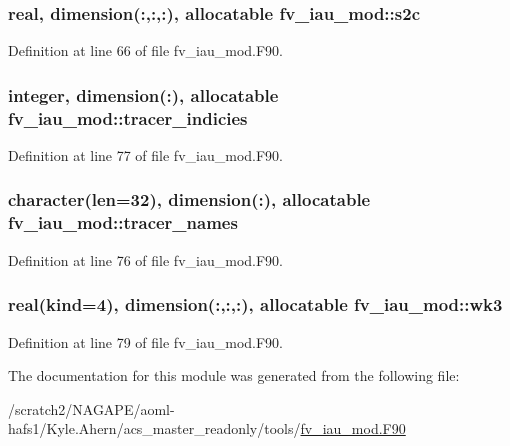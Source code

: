 \subsubsection[{s2c}]{\setlength{\rightskip}{0pt plus 5cm}real, dimension(\-:,\-:,\-:), allocatable fv\-\_\-iau\-\_\-mod\-::s2c\hspace{0.3cm}{\ttfamily [private]}}\label{classfv__iau__mod_a0967901620cb181a32bcb765735ca893}


Definition at line 66 of file fv\-\_\-iau\-\_\-mod.\-F90.

\subsubsection[{tracer\-\_\-indicies}]{\setlength{\rightskip}{0pt plus 5cm}integer, dimension(\-:), allocatable fv\-\_\-iau\-\_\-mod\-::tracer\-\_\-indicies\hspace{0.3cm}{\ttfamily [private]}}\label{classfv__iau__mod_a21f83d74d28c045c736b76aa21d14811}


Definition at line 77 of file fv\-\_\-iau\-\_\-mod.\-F90.

\subsubsection[{tracer\-\_\-names}]{\setlength{\rightskip}{0pt plus 5cm}character(len=32), dimension(\-:), allocatable fv\-\_\-iau\-\_\-mod\-::tracer\-\_\-names\hspace{0.3cm}{\ttfamily [private]}}\label{classfv__iau__mod_a271662be2cbbaca55eee2fcba5fe1aa0}


Definition at line 76 of file fv\-\_\-iau\-\_\-mod.\-F90.

\subsubsection[{wk3}]{\setlength{\rightskip}{0pt plus 5cm}real(kind=4), dimension(\-:,\-:,\-:), allocatable fv\-\_\-iau\-\_\-mod\-::wk3\hspace{0.3cm}{\ttfamily [private]}}\label{classfv__iau__mod_a9d129637a99655ead2bcf3978b8e03bb}


Definition at line 79 of file fv\-\_\-iau\-\_\-mod.\-F90.



The documentation for this module was generated from the following file\-:\begin{DoxyCompactItemize}
\item 
/scratch2/\-N\-A\-G\-A\-P\-E/aoml-\/hafs1/\-Kyle.\-Ahern/acs\-\_\-master\-\_\-readonly/tools/\hyperlink{fv__iau__mod_8F90}{fv\-\_\-iau\-\_\-mod.\-F90}\end{DoxyCompactItemize}
